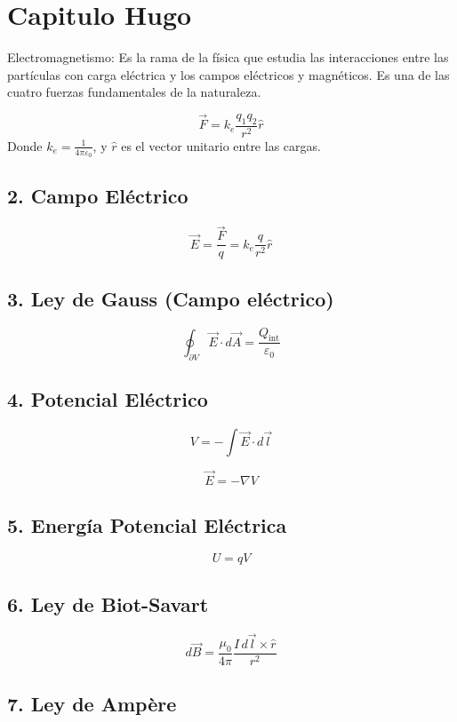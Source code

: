 \section{Capitulo Hugo}
Electromagnetismo: Es la rama de la física que estudia las interacciones entre las partículas con carga eléctrica y los campos eléctricos y magnéticos. Es una de las cuatro fuerzas fundamentales de la naturaleza.


\[
\vec{F} = k_e \frac{q_1 q_2}{r^2} \hat{r}
\]
Donde \( k_e = \frac{1}{4\pi\varepsilon_0} \), y \( \hat{r} \) es el vector unitario entre las cargas.

\subsection*{2. Campo Eléctrico}

\[
\vec{E} = \frac{\vec{F}}{q} = k_e \frac{q}{r^2} \hat{r}
\]

\subsection*{3. Ley de Gauss (Campo eléctrico)}

\[
\oint_{\partial V} \vec{E} \cdot d\vec{A} = \frac{Q_{\text{int}}}{\varepsilon_0}
\]

\subsection*{4. Potencial Eléctrico}

\[
V = - \int \vec{E} \cdot d\vec{l}
\]

\[
\vec{E} = - \nabla V
\]

\subsection*{5. Energía Potencial Eléctrica}

\[
U = qV
\]

\subsection*{6. Ley de Biot-Savart}

\[
d\vec{B} = \frac{\mu_0}{4\pi} \frac{I\, d\vec{l} \times \hat{r}}{r^2}
\]

\subsection*{7. Ley de Ampère}

